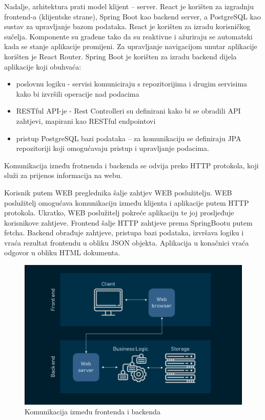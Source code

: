 	\noindent Nadalje, arhitektura prati model klijent – server. 
	React je korišten za izgradnju frontend-a (klijentske strane), Spring Boot kao backend server, a PostgreSQL kao sustav za upravljanje bazom podataka.     React je korišten za izradu korisničkog sučelja. Komponente su građene tako da su reaktivne i ažuriraju se automatski kada se stanje aplikacije promijeni. Za upravljanje navigacijom unutar aplikacije korišten je React Router.
	Spring Boot je korišten za izradu backend dijela aplikacije koji obuhvaća:
	
	\begin{itemize}
		\item poslovnu logiku - servisi komuniciraju s repozitorijima i drugim servisima kako bi izvršili operacije nad podacima
		\item RESTful API-je - Rest Controlleri su definirani kako bi se obradili API zahtjevi, mapirani kao RESTful endpointovi
		\item pristup PostgreSQL bazi podataka – za komunikaciju se definiraju JPA repozitoriji koji omogućavaju pristup i upravljanje podacima.
	\end{itemize}
	
	\noindent Komunikacija izneđu frotnenda i backenda se odvija preko HTTP protokola, koji služi za prijenos informacija na webu.
	
	Korisnik putem WEB preglednika šalje zahtjev WEB poslužitelju. WEB poslužitelj omogućava komunikaciju između klijenta i aplikacije putem HTTP protokola. Ukratko, WEB poslužitelj pokreće aplikaciju te joj prosljeđuje korisnikove zahtjeve. Frontend šalje HTTP zahtjeve prema SpringBootu putem fetcha. Backend obrađuje zahtjeve, pristupa bazi podataka, izvršava logiku i vraća rezultat frontendu u obliku JSON objekta.  Aplikacija u konačnici vraća odgovor u obliku HTML dokumenta.
	
		\begin{figure}[H]
		\includegraphics[scale=0.5]{slike/komunikacija.png} %
		\centering
		\caption{Komunikacija između frontenda i backenda}
		\label{fig:komunikacija} %
		\end{figure}
	
